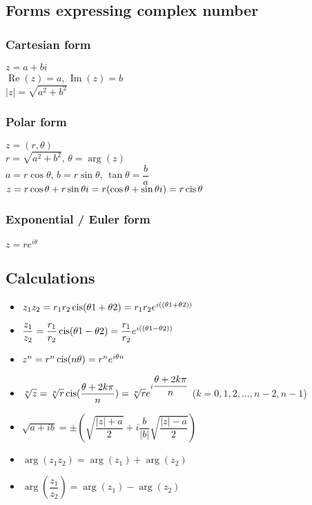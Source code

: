 \subsection{Forms expressing complex number}
\subsubsection{Cartesian form}
$z=a+bi$\\
$\operatorname{Re}(z) = a$, $\operatorname{Im}(z) = b$\\
$|z|=\sqrt{a^2+b^2}$
\subsubsection{Polar form}
$z=(r,\theta)$\\
$r=\sqrt{a^2+b^2}$, $\theta = \arg(z)$\\
$a=r\cos\theta$, $b=r\sin\theta$, $\tan\theta=\dfrac{b}{a}$\\
$z=r\cos\theta+r\sin\theta i = r(\cos\theta+\sin\theta i)=r\operatorname{cis} \theta$

\subsubsection{Exponential / Euler form}
$z=re^{i\theta}$


\subsection{Calculations}
\begin{itemize}
	\item $z_1z_2=r_1r_2\operatorname{cis}(\theta1+\theta2)=r_1r_2e^{i((\theta1+\theta2))}$
	\item $\dfrac{z_1}{z_2}=\dfrac{r_1}{r_2}\operatorname{cis}(\theta1-\theta2)=\dfrac{r_1}{r_2}e^{i((\theta1-\theta2))}$
	\item $z^n = r^n\operatorname{cis}(n\theta)=r^ne^{i\theta n}$
	\item $\sqrt[n]{z}=\sqrt[n]{r}\operatorname{cis}(\dfrac{\theta+2k\pi}{n})=\sqrt[n]{r}e^{i\dfrac{\theta+2k\pi}{n}}$ ($k=0,1,2,\dots,n-2,n-1$)
	\item $\sqrt{a+ib}=\pm(\sqrt{\dfrac{|z|+a}{2}}+i\dfrac{b}{|b|}\sqrt{\dfrac{|z|-a}{2}})$
	\item $\arg(z_1z_2)=\arg(z_1)+\arg(z_2)$
	\item $\arg(\dfrac{z_1}{z_2})=\arg(z_1)-\arg(z_2)$
\end{itemize}

